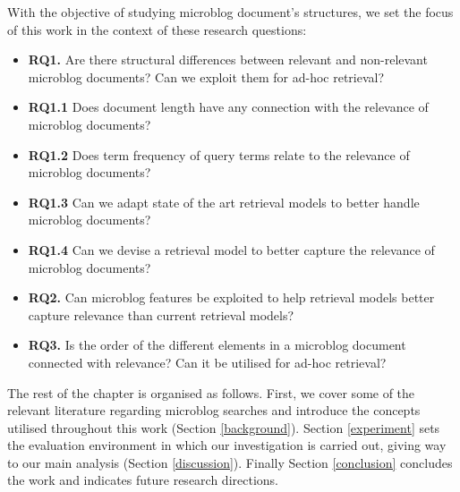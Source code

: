 With the objective of studying microblog document's structures, we set the focus of this work in the context of these research questions: 

\begin{itemize}

\item[] \textbf{RQ1.} Are there structural differences between relevant and non-relevant microblog documents? Can we exploit them for ad-hoc retrieval?

\item[] \textbf{RQ1.1} Does document length have any connection with the relevance of microblog documents?
\item[] \textbf{RQ1.2} Does term frequency of query terms relate to the relevance of microblog documents? 
\item[] \textbf{RQ1.3} Can we adapt state of the art retrieval models to better handle microblog documents?
\item[] \textbf{RQ1.4} Can we devise a retrieval model to better capture the relevance of microblog documents?

\item[] \textbf{RQ2.} Can microblog features be exploited to help retrieval models better capture relevance than current retrieval models?
\item[] \textbf{RQ3.} Is the order of the different elements in a microblog document connected with relevance? Can it be utilised for ad-hoc retrieval?

\end{itemize}

The rest of the chapter is organised as follows. First, we cover some of the relevant literature regarding microblog searches and introduce the concepts utilised throughout this work (Section \ref{background}). Section \ref{experiment} sets the evaluation environment in which our investigation is carried out, giving way to our main analysis (Section \ref{discussion}). Finally Section \ref{conclusion} concludes the work and indicates future research directions.

%
%
%
%


